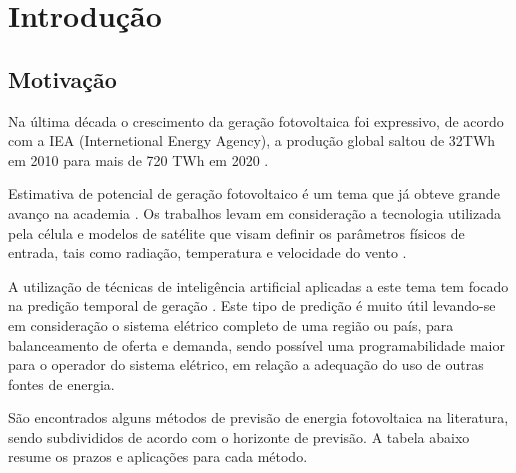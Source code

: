 \chapter{Introdução}\label{cap:introducao}

\section{Motivação}

Na última década o crescimento da geração fotovoltaica foi expressivo, de acordo com a IEA (Internetional Energy Agency), a produção global saltou de 32TWh em 2010 para mais de 720 TWh em 2020 \cite{ieasolarpvontrack2020}. 

Estimativa de potencial de geração fotovoltaico é um tema que já obteve grande avanço na academia \cite{chin2015cell, jordehi2016parameter, de2017performance}. Os trabalhos levam em consideração a tecnologia utilizada pela célula e modelos de satélite que visam definir os parâmetros físicos de entrada, tais como radiação, temperatura e velocidade do vento \cite{mueller2009cm, huld2012new, amillo2014new, habte2017evaluation}.

A utilização de técnicas de inteligência artificial aplicadas a este tema tem focado na predição temporal de geração \cite{voyant2017machine, wolff2016statistical, li2016hierarchical}. Este tipo de predição é muito útil levando-se em consideração o sistema elétrico completo de uma região ou país, para balanceamento de oferta e demanda, sendo possível uma programabilidade maior para o operador do sistema elétrico, em relação a adequação do uso de outras fontes de energia.

São encontrados alguns métodos de previsão de energia fotovoltaica na literatura, sendo subdivididos de acordo com o horizonte de previsão. A tabela abaixo resume os prazos e aplicações para cada método.

